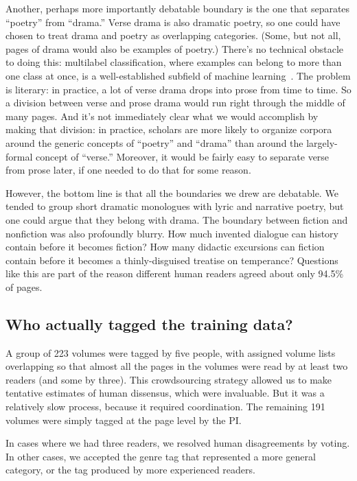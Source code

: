 \documentclass[paper=a4, fontsize=12pt]{scrartcl}
\numberwithin{equation}{section}		%
\numberwithin{figure}{section}			%
\numberwithin{table}{section}				%
\begin{document}
Another, perhaps more importantly debatable boundary is the one that separates ``poetry'' from ``drama.'' Verse drama is also dramatic poetry, so one could have chosen to treat drama and poetry as overlapping categories. (Some, but not all, pages of drama would also be examples of poetry.) There's no technical obstacle to doing this: multilabel classification, where examples can belong to more than one class at once, is a well-established subfield of machine learning~\cite{tsoumakas:multilabel}. The problem is literary: in practice, a lot of verse drama drops into prose from time to time. So a division between verse and prose drama would run right through the middle of many pages. And it's not immediately clear what we would accomplish by making that division: in practice, scholars are more likely to organize corpora around the generic concepts of ``poetry'' and ``drama'' than around the largely-formal concept of ``verse.'' Moreover, it would be fairly easy to separate verse from prose later, if one needed to do that for some reason.

However, the bottom line is that all the boundaries we drew are debatable. We tended to group short dramatic monologues with lyric and narrative poetry, but one could argue that they belong with drama. The boundary between fiction and nonfiction was also profoundly blurry. How much invented dialogue can history contain before it becomes fiction? How many didactic excursions can fiction contain before it becomes a thinly-disguised treatise on temperance? Questions like this are part of the reason different human readers agreed about only 94.5\% of pages.

\subsection{Who actually tagged the training data?}
A group of 223 volumes were tagged by five people, with assigned volume lists overlapping so that almost all the pages in the volumes were read by at least two readers (and some by three). This crowdsourcing strategy allowed us to make tentative estimates of human dissensus, which were invaluable. But it was a relatively slow process, because it required coordination. The remaining 191 volumes were simply tagged at the page level by the PI.

In cases where we had three readers, we resolved human disagreements by voting. In other cases, we accepted the genre tag that represented a more general category, or the tag produced by more experienced readers.
\end{document}
